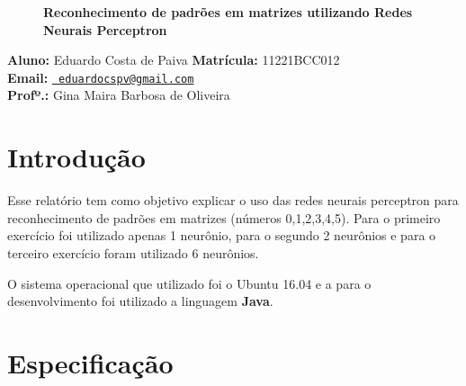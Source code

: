 \documentclass[hidelinks,12pt]{article}
\newcommand{\bigicon}[1]{\texttt{[image: \#1]}}
\begin{document}
\pagestyle{fancy}


\lhead{\bigicon{Figures/ufu}}
\rhead{\bigicon{Figures/facom}}
\lfoot{}
\cfoot{}
\rfoot{}
\vspace*{8.5cm}
\begin{figure}[!h]
	\centering
	\Huge{\bf {Reconhecimento de padrões em matrizes utilizando Redes Neurais Perceptron}}
\end{figure}

\vspace*{5cm}

\noindent\textbf{Aluno:} Eduardo Costa de Paiva \qquad \textbf{Matrícula:} 11221BCC012 \\
\textbf{Email:} \texttt{\small \url{ eduardocspv@gmail.com}}\\
\textbf{Profº.:} Gina Maira Barbosa de Oliveira


\newpage
\fancyhead[C]{}
\fancyhead[R]{}
\fancyhead[L]{\leftmark}
\fancyfoot{}
\fancyfoot[C]{\hspace{1.5cm}\thepage}


{\let\thefootnote\relax{}}

\newpage

\tableofcontents


\newpage

\section{Introdução}

	Esse relatório tem como objetivo explicar o uso das redes neurais perceptron para reconhecimento de padrões em matrizes (números 0,1,2,3,4,5). Para o primeiro exercício foi utilizado apenas 1 neurônio, para o segundo 2 neurônios e para o terceiro exercício foram utilizado 6 neurônios.
	
	O sistema operacional que utilizado foi o Ubuntu 16.04 e a para o desenvolvimento foi utilizado a linguagem {\bf{Java}}.

\section{Especificação}
		
\end{document}
